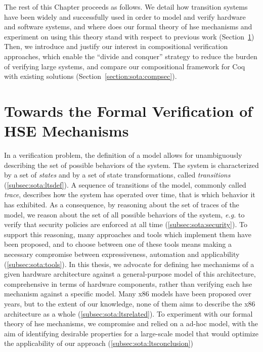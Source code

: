 The rest of this Chapter proceeds as follows.
%
We detail how transition systems have been widely and successfully used in order
to model and verify hardware and software systems, and where does our formal
theory of \ac{hse} mechanisms and experiment on using this theory
stand with respect to previous work (Section~\ref{sec:sota:formalisms})
%
Then, we introduce and justify our interest in compositional verification
approaches, which enable the ``divide and conquer'' strategy to reduce the
burden of verifying large systems, and compare our compositional framework for
Coq with existing solutions (Section~\ref{section:sota:compsec}).

\section{Towards the Formal Verification of HSE Mechanisms}
\label{sec:sota:formalisms}

In a verification problem, the definition of a model allows for unambiguously
describing the set of possible behaviors of the system.
%
The system is characterized by a set of \emph{states} and by a set of state
transformations, called \emph{transitions} (\ref{subsec:sota:ltsdef}).
%
A sequence of transitions of the model, commonly called \emph{trace}, describes
how the system has operated over time, that is which behavior it has exhibited.
%
As a consequence, by reasoning about the set of traces of the model, we reason
about the set of all possible behaviors of the system, \emph{e.g.} to verify
that security policies are enforced at all time (\ref{subsec:sota:security}).
%
To support this reasoning, many approaches and tools which implement them have
been proposed, and to choose between one of these tools means making a necessary
compromise between expressiveness, automation and applicability
(\ref{subsec:sota:tools}).
%
In this thesis, we advocate for defining \ac{hse} mechanisms of a given hardware
architecture against a general-purpose model of this architecture, comprehensive
in terms of hardware components, rather than verifying each \ac{hse} mechanism
against a specific model.
%
Many x86 models have been proposed over years, but to the extent of our
knowledge, none of them aims to describe the x86 architecture as a whole
(\ref{subsec:sota:ltsrelated}).
%
To experiment with our formal theory of \ac{hse} mechanisms, we compromise
and relied on a ad-hoc model, with the aim of identifying desirable properties
for a large-scale model that would optimize the applicability of our approach
(\ref{subsec:sota:ltsconclusion})

